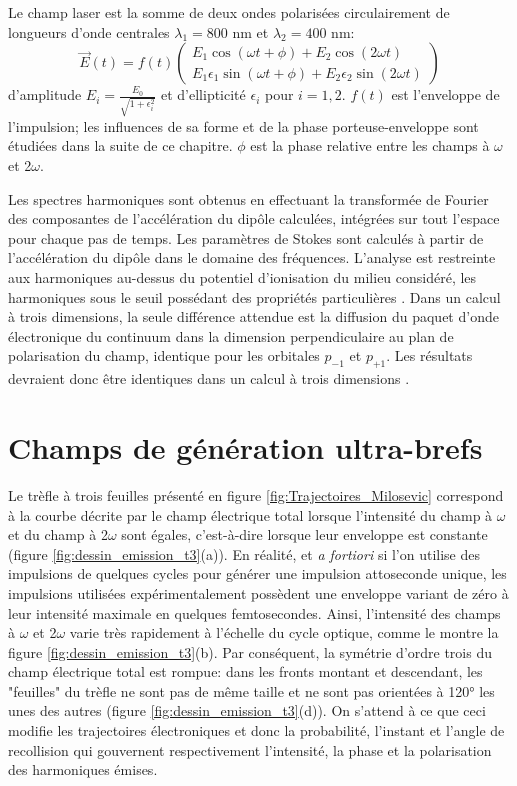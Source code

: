 Le champ laser est la somme de deux ondes polarisées circulairement de longueurs d'onde centrales $\lambda_1 = 800$ nm et $\lambda_2 = 400$ nm:
\begin{equation}
\vec{E}(t) = f(t) \begin{pmatrix}
E_1 \cos (\omega t + \phi) + E_2 \cos (2\omega t) \\
E_1 \epsilon_1 \sin (\omega t + \phi) + E_2 \epsilon_2 \sin (2\omega t)
\end{pmatrix}
\label{eq:champTA}
\end{equation}
d'amplitude $E_i = \frac{E_0}{\sqrt{1 + \epsilon_i^2}}$ et d'ellipticité $\epsilon_i$ pour $i = 1,2$. $f(t)$ est l'enveloppe de l'impulsion; les influences de sa forme et de la phase porteuse-enveloppe sont étudiées dans la suite de ce chapitre. $\phi$ est la phase relative entre les champs à $\omega$ et 2$\omega$.

Les spectres harmoniques sont obtenus en effectuant la transformée de Fourier des composantes de l'accélération du dipôle calculées, intégrées sur tout l'espace pour chaque pas de temps. Les paramètres de Stokes sont calculés à partir de l'accélération du dipôle dans le domaine des fréquences. L'analyse est restreinte aux harmoniques au-dessus du potentiel d'ionisation du milieu considéré, les harmoniques sous le seuil possédant des propriétés particulières . Dans un calcul à trois dimensions, la seule différence attendue est la diffusion du paquet d'onde électronique du continuum dans la dimension perpendiculaire au plan de polarisation du champ, identique pour les orbitales $p_{-1}$ et $p_{+1}$. Les résultats devraient donc être identiques dans un calcul à trois dimensions .

\section{Champs de génération ultra-brefs}
\label{sec:ChampsBrefs}
Le trèfle à trois feuilles présenté en figure \ref{fig:Trajectoires_Milosevic} correspond à la courbe décrite par le champ électrique total lorsque l'intensité du champ à $\omega$ et du champ à 2$\omega$ sont égales, c'est-à-dire lorsque leur enveloppe est constante (figure \ref{fig:dessin_emission_t3}(a)). En réalité, et \textit{a fortiori} si l'on utilise des impulsions de quelques cycles pour générer une impulsion attoseconde unique, les impulsions utilisées expérimentalement possèdent une enveloppe variant de zéro à leur intensité maximale en quelques femtosecondes. Ainsi, l'intensité des champs à $\omega$ et 2$\omega$ varie très rapidement à l'échelle du cycle optique, comme le montre la figure \ref{fig:dessin_emission_t3}(b). Par conséquent, la symétrie d'ordre trois du champ électrique total est rompue: dans les fronts montant et descendant, les "feuilles" du trèfle ne sont pas de même taille et ne sont pas orientées à 120° les unes des autres (figure \ref{fig:dessin_emission_t3}(d)). On s'attend à ce que ceci modifie les trajectoires électroniques et donc la probabilité, l'instant et l'angle de recollision qui gouvernent respectivement l'intensité, la phase et la polarisation des harmoniques émises.

